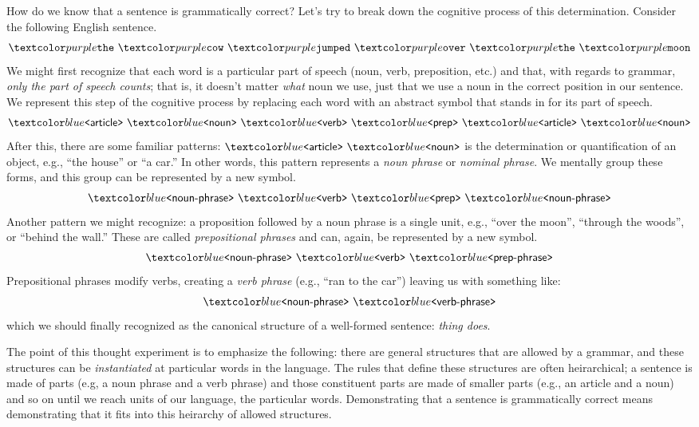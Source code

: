 How do we know that a sentence is grammatically correct?
Let's try to break down the cognitive process of this determination.
Consider the following English sentence.
\begin{align*}
  \bnft{the} \ \bnft{cow} \ \bnft{jumped} \ \bnft{over} \ \bnft{the} \ \bnft{moon}
\end{align*}
%
We might first recognize that each word is a particular part of speech (noun, verb, preposition, etc.) and that, with regards to grammar, \textit{only the part of speech counts}; that is, it doesn't matter \textit{what} noun we use, just that we use a noun in the correct position in our sentence.
We represent this step of the cognitive process by replacing each word with an abstract symbol that stands in for its part of speech.
\begin{align*}
  \bnfnt{article} \ \bnfnt{noun} \ \bnfnt{verb} \ \bnfnt{prep} \ \bnfnt{article} \ \bnfnt{noun}
\end{align*}
%
After this, there are some familiar patterns: $\bnfnt{article} \ \bnfnt{noun}$ is the determination or quantification of an object, e.g., \enquote{the house} or \enquote{a car.}
In other words, this pattern represents a \textit{noun phrase} or \textit{nominal phrase}.
We mentally group these forms, and this group can be represented by a new symbol.
\begin{align*}
  \bnfnt{noun-phrase} \ \bnfnt{verb} \ \bnfnt{prep} \ \bnfnt{noun-phrase}
\end{align*}
%
Another pattern we might recognize: a proposition followed by a noun phrase is a single unit, e.g., \enquote{over the moon}, \enquote{through the woods}, or \enquote{behind the wall.}
These are called \textit{prepositional phrases} and can, again, be represented by a new symbol.
\begin{align*}
  \bnfnt{noun-phrase} \ \bnfnt{verb} \ \bnfnt{prep-phrase}
\end{align*}
%
Prepositional phrases modify verbs, creating a \textit{verb phrase} (e.g., \enquote{ran to the car}) leaving us with something like:
\begin{align*}
  \bnfnt{noun-phrase} \ \bnfnt{verb-phrase}
\end{align*}
%
which we should finally recognized as the canonical structure of a well-formed sentence: \textit{thing does}.

The point of this thought experiment is to emphasize the following: there are general structures that are allowed by a grammar, and these structures can be \textit{instantiated} at particular words in the language.
The rules that define these structures are often heirarchical; a sentence is made of parts (e.g, a noun phrase and a verb phrase) and those constituent parts are made of smaller parts (e.g., an article and a noun) and so on until we reach units of our language, the particular words.
Demonstrating that a sentence is grammatically correct means demonstrating that it fits into this heirarchy of allowed structures.

